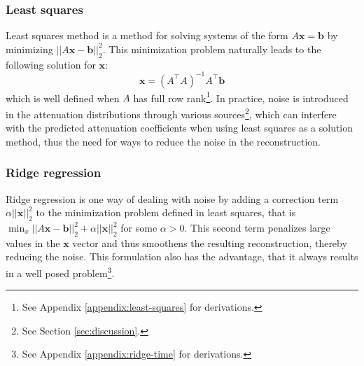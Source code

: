 \documentclass{article}
\begin{document}
\subsubsection{Least squares}\label{sec:least-squares-text} 
Least squares method is a method for solving systems of the form $A\mathbf{x} = \mathbf{b}$ by minimizing $||A\mathbf{x} - \mathbf{b}||_{2}^{2}$. This minimization problem naturally leads to the following solution for $\mathbf{x}$:
\begin{equation}
    \mathbf{x} = (A^\intercal A)^{-1} A^\intercal \mathbf{b}
\end{equation}
which is well defined when $A$ has full row rank\footnote{See Appendix \ref{appendix:least-squares} for derivations.}. In practice, noise is introduced in the attenuation distributions through various sources\footnote{See Section \ref{sec:discussion}.}, which can interfere with the predicted attenuation coefficients when using least squares as a solution method, thus the need for ways to reduce the noise in the reconstruction.

\subsubsection{Ridge regression}\label{sec:ridgre-regression-text}
Ridge regression is one way of dealing with noise by adding a correction term $\alpha ||\mathbf{x}||_2^2$ to the minimization problem defined in least squares, that is $\min_x ||A\mathbf{x} - \mathbf{b}||_2^2 + \alpha ||\mathbf{x}||_2^2$ for some $\alpha > 0$. This second term penalizes large values in the $\mathbf{x}$ vector and thus smoothens the resulting reconstruction, thereby reducing the noise. This formulation also has the advantage, that it always results in a well posed problem\footnote{See Appendix \ref{appendix:ridge-time} for derivations.}.

\end{document}
